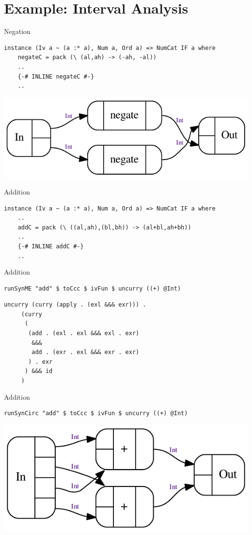 \documentclass[10pt]{beamer}
\theoremstyle{definition}
\theoremstyle{remark}
\numberwithin{equation}{section}
\begin{document}
\section{Example: Interval Analysis} %

\begin{frame}[fragile]{Negation}
  \begin{lstlisting}[frame=single]
  instance (Iv a ~ (a :* a), Num a, Ord a) => NumCat IF a where
    negateC = pack (\ (al,ah) -> (-ah, -al))
    ..
    {-# INLINE negateC #-}
    ..
  \end{lstlisting}
  \includegraphics{neg-iv.pdf}
\end{frame}

\begin{frame}[fragile]{Addition}
  \begin{lstlisting}[frame=single]
  instance (Iv a ~ (a :* a), Num a, Ord a) => NumCat IF a where
    ..
    addC = pack (\ ((al,ah),(bl,bh)) -> (al+bl,ah+bh))
    ..
    {-# INLINE addC #-}
    ..
  \end{lstlisting}
\end{frame}

\begin{frame}[fragile]{Addition}
  \begin{lstlisting}[frame=single]
    runSynME "add" $ toCcc $ ivFun $ uncurry ((+) @Int)
  \end{lstlisting}
  \begin{lstlisting}[frame=single]
     uncurry (curry (apply . (exl &&& exr))) .
     (curry
      (
       (add . (exl . exl &&& exl . exr)
        &&&
        add . (exr . exl &&& exr . exr)
       ) . exr
      ) &&& id
     )
  \end{lstlisting}
\end{frame}

\begin{frame}[fragile]{Addition}
  \begin{lstlisting}[frame=single]
    runSynCirc "add" $ toCcc $ ivFun $ uncurry ((+) @Int)
  \end{lstlisting}
  \includegraphics{add-iv.pdf}
\end{frame}
\end{document}
